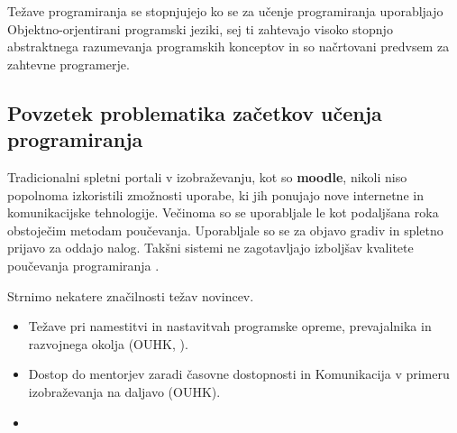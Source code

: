 Težave programiranja se stopnjujejo ko se za učenje programiranja
uporabljajo Objektno-orjentirani programski jeziki, sej ti zahtevajo
visoko stopnjo abstraktnega razumevanja programskih konceptov in so
načrtovani predvsem za zahtevne programerje.




\subsection{Povzetek problematika začetkov učenja programiranja}
\label{sec:Problematika_začetkov_učenja_programiranja}




Tradicionalni spletni portali v izobraževanju, kot so \textbf{moodle},
nikoli niso popolnoma izkoristili zmožnosti uporabe, ki jih ponujajo
nove internetne in komunikacijske tehnologije. Večinoma so se
uporabljale le kot podaljšana roka obstoječim metodam
poučevanja. Uporabljale so se za objavo gradiv in spletno prijavo za
oddajo nalog. Takšni sistemi ne zagotavljajo izboljšav kvalitete
poučevanja programiranja \cite{ITaLCP_DistanceEdu}.

Strnimo nekatere značilnosti težav novincev.

\begin{itemize}
\tightlist
\item Težave pri namestitvi in nastavitvah programske opreme,
  prevajalnika in razvojnega okolja (OUHK, ).
\item Dostop do mentorjev zaradi časovne dostopnosti in Komunikacija v
  primeru izobraževanja na daljavo (OUHK).
\item
\end{itemize}

